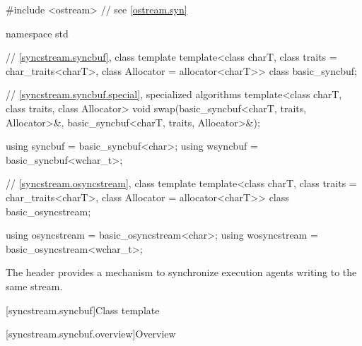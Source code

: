 %
%
%
%
%
\begin{codeblock}
#include <ostream>  // see \ref{ostream.syn}

namespace std {
  // \ref{syncstream.syncbuf}, class template 
  template<class charT, class traits = char_traits<charT>, class Allocator = allocator<charT>>
    class basic_syncbuf;

  // \ref{syncstream.syncbuf.special}, specialized algorithms
  template<class charT, class traits, class Allocator>
    void swap(basic_syncbuf<charT, traits, Allocator>&,
              basic_syncbuf<charT, traits, Allocator>&);

  using syncbuf = basic_syncbuf<char>;
  using wsyncbuf = basic_syncbuf<wchar_t>;

  // \ref{syncstream.osyncstream}, class template 
  template<class charT, class traits = char_traits<charT>, class Allocator = allocator<charT>>
    class basic_osyncstream;

  using osyncstream = basic_osyncstream<char>;
  using wosyncstream = basic_osyncstream<wchar_t>;
}
\end{codeblock}

\pnum
The header  provides a mechanism
to synchronize execution agents writing to the same stream.

[syncstream.syncbuf]{Class template }

[syncstream.syncbuf.overview]{Overview}

